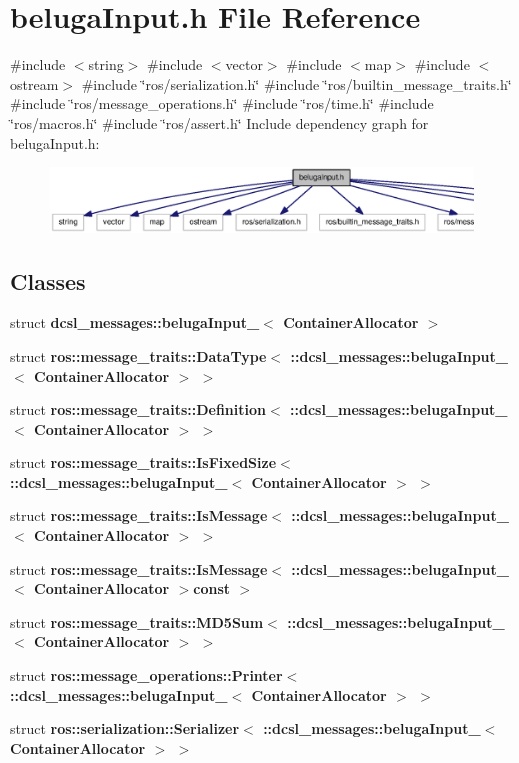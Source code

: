 \section{beluga\-Input.\-h \-File \-Reference}
\label{belugaInput_8h}
{\ttfamily \#include $<$string$>$}\*
{\ttfamily \#include $<$vector$>$}\*
{\ttfamily \#include $<$map$>$}\*
{\ttfamily \#include $<$ostream$>$}\*
{\ttfamily \#include \char`\"{}ros/serialization.\-h\char`\"{}}\*
{\ttfamily \#include \char`\"{}ros/builtin\-\_\-message\-\_\-traits.\-h\char`\"{}}\*
{\ttfamily \#include \char`\"{}ros/message\-\_\-operations.\-h\char`\"{}}\*
{\ttfamily \#include \char`\"{}ros/time.\-h\char`\"{}}\*
{\ttfamily \#include \char`\"{}ros/macros.\-h\char`\"{}}\*
{\ttfamily \#include \char`\"{}ros/assert.\-h\char`\"{}}\*
\-Include dependency graph for beluga\-Input.\-h\-:
\nopagebreak
\begin{figure}[H]
\begin{center}
\leavevmode
\includegraphics[width=350pt]{belugaInput_8h__incl}
\end{center}
\end{figure}
\subsection*{\-Classes}
\begin{DoxyCompactItemize}
\item 
struct {\bf dcsl\-\_\-messages\-::beluga\-Input\-\_\-$<$ Container\-Allocator $>$}
\item 
struct {\bf ros\-::message\-\_\-traits\-::\-Data\-Type$<$ \-::dcsl\-\_\-messages\-::beluga\-Input\-\_\-$<$ Container\-Allocator $>$ $>$}
\item 
struct {\bf ros\-::message\-\_\-traits\-::\-Definition$<$ \-::dcsl\-\_\-messages\-::beluga\-Input\-\_\-$<$ Container\-Allocator $>$ $>$}
\item 
struct {\bf ros\-::message\-\_\-traits\-::\-Is\-Fixed\-Size$<$ \-::dcsl\-\_\-messages\-::beluga\-Input\-\_\-$<$ Container\-Allocator $>$ $>$}
\item 
struct {\bf ros\-::message\-\_\-traits\-::\-Is\-Message$<$ \-::dcsl\-\_\-messages\-::beluga\-Input\-\_\-$<$ Container\-Allocator $>$ $>$}
\item 
struct {\bf ros\-::message\-\_\-traits\-::\-Is\-Message$<$ \-::dcsl\-\_\-messages\-::beluga\-Input\-\_\-$<$ Container\-Allocator $>$const  $>$}
\item 
struct {\bf ros\-::message\-\_\-traits\-::\-M\-D5\-Sum$<$ \-::dcsl\-\_\-messages\-::beluga\-Input\-\_\-$<$ Container\-Allocator $>$ $>$}
\item 
struct {\bf ros\-::message\-\_\-operations\-::\-Printer$<$ \-::dcsl\-\_\-messages\-::beluga\-Input\-\_\-$<$ Container\-Allocator $>$ $>$}
\item 
struct {\bf ros\-::serialization\-::\-Serializer$<$ \-::dcsl\-\_\-messages\-::beluga\-Input\-\_\-$<$ Container\-Allocator $>$ $>$}
\end{DoxyCompactItemize}

